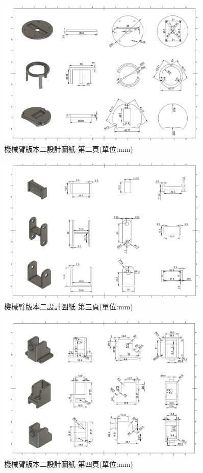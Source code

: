 \documentclass[class=NCU_thesis, crop=false]{standalone}
\begin{document}
\begin{figure}[htbp]
    \centering
    \includegraphics[width=0.9\textwidth]{figures/Armv2 (2).PNG}
    \caption{機械臂版本二設計圖紙 第二頁(單位:mm)}
\end{figure}

\begin{figure}[htbp]
    \centering
    \includegraphics[width=0.9\textwidth]{figures/Armv2 (3).PNG}
    \caption{機械臂版本二設計圖紙 第三頁(單位:mm)}
\end{figure}

\begin{figure}[htbp]
    \centering
    \includegraphics[width=0.9\textwidth]{figures/Armv2 (4).PNG}
    \caption{機械臂版本二設計圖紙 第四頁(單位:mm)}
\end{figure}
\end{document}
